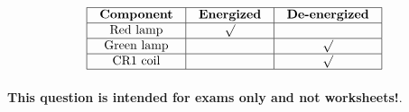 






$$\vbox{\offinterlineskip
\halign{\strut
\vrule \quad\hfil # \ \hfil & 
\vrule \quad\hfil # \ \hfil & 
\vrule \quad\hfil # \ \hfil \vrule \cr
\noalign{\hrule}
%
{\bf Component} & {\bf Energized} & {\bf De-energized} \cr
%
\noalign{\hrule}
%
Red lamp & $\surd$ &  \cr
%
\noalign{\hrule}
%
Green lamp &  & $\surd$ \cr
%
\noalign{\hrule}
%
CR1 coil &  & $\surd$ \cr
%
\noalign{\hrule}
} %
}$$ %








{\bf This question is intended for exams only and not worksheets!}.


